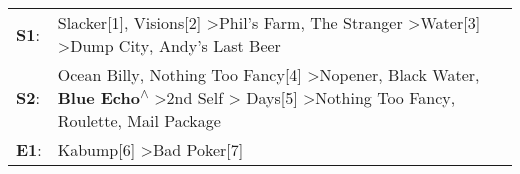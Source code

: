 \begin{supertabular}{p{0.03\textwidth}p{0.92\textwidth}}
 \textbf{S1}:  &                                                                                                                                                           Slacker[1]\textsuperscript{}, \enspace Visions[2]\textsuperscript{} \textgreater \enspace Phil's Farm\textsuperscript{}, \enspace The Stranger\textsuperscript{} \textgreater \enspace Water[3]\textsuperscript{} \textgreater \enspace Dump City\textsuperscript{}, \enspace Andy's Last Beer\textsuperscript{}  \enspace  \\
 \textbf{S2}:  &  Ocean Billy\textsuperscript{}, \enspace Nothing Too Fancy[4]\textsuperscript{} \textgreater \enspace Nopener\textsuperscript{}, \enspace Black Water\textsuperscript{}, \enspace \textbf{Blue Echo\textsuperscript{$\wedge$}} \textgreater \enspace 2nd Self\textsuperscript{} \textgreater {} Days[5]\textsuperscript{} \textgreater \enspace Nothing Too Fancy\textsuperscript{}, \enspace Roulette\textsuperscript{}, \enspace Mail Package\textsuperscript{}  \enspace  \\
 \textbf{E1}:  &                                                                                                                                                                                                                                                                                                                                                                                           Kabump[6]\textsuperscript{} \textgreater \enspace Bad Poker[7]\textsuperscript{}  \enspace  \\
\end{supertabular}
